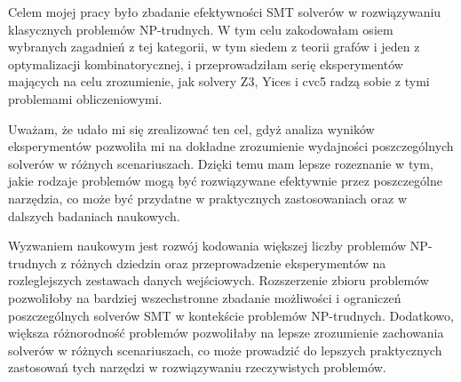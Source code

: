 \summary
Celem mojej pracy było zbadanie efektywności SMT solverów w rozwiązywaniu klasycznych problemów NP-trudnych. W tym celu zakodowałam osiem wybranych zagadnień z tej kategorii, w tym siedem z teorii grafów i jeden z optymalizacji kombinatorycznej, i przeprowadziłam serię eksperymentów mających na celu zrozumienie, jak solvery Z3, Yices i cvc5 radzą sobie z tymi problemami obliczeniowymi.

Uważam, że udało mi się zrealizować ten cel, gdyż analiza wyników eksperymentów pozwoliła mi na dokładne zrozumienie wydajności poszczególnych solverów w różnych scenariuszach. Dzięki temu mam lepsze rozeznanie w tym, jakie rodzaje problemów mogą być rozwiązywane efektywnie przez poszczególne narzędzia, co może być przydatne w praktycznych zastosowaniach oraz w dalszych badaniach naukowych.

Wyzwaniem naukowym jest rozwój kodowania większej liczby problemów NP-trudnych z różnych dziedzin oraz przeprowadzenie eksperymentów na rozleglejszych zestawach danych wejściowych. Rozszerzenie zbioru problemów pozwoliłoby na bardziej wszechstronne zbadanie możliwości i ograniczeń poszczególnych solverów SMT w kontekście problemów NP-trudnych. Dodatkowo, większa różnorodność problemów pozwoliłaby na lepsze zrozumienie zachowania solverów w różnych scenariuszach, co może prowadzić do lepszych praktycznych zastosowań tych narzędzi w rozwiązywaniu rzeczywistych problemów.